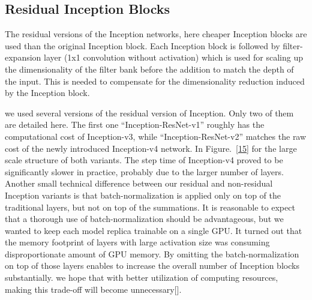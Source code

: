 \documentclass[a4paper,12pt, twoside]{NITKReport}
\begin{document}
\subsection{Residual Inception Blocks}
\par The residual versions of the Inception networks, here cheaper Inception  blocks are used than the original Inception block. Each Inception block is followed by filter-expansion layer (1x1 convolution  without  activation) which is used  for scaling up the dimensionality of the filter bank before the addition to match the depth of the input. This is needed to compensate for the dimensionality reduction induced by the Inception block.
\par we used several versions of the residual version of Inception. Only  two  of them are detailed here. The first one “Inception-ResNet-v1” roughly has the computational cost of Inception-v3, while “Inception-ResNet-v2” matches the raw cost of the newly introduced Inception-v4 network. In Figure.~\ref{15} for the large scale structure of both variants. The step time of Inception-v4 proved to be significantly slower in practice, probably due to the larger number of layers.
Another  small  technical  difference  between  our  residual and non-residual Inception variants is that batch-normalization is applied only on top of the traditional layers, but not on top of the summations. It is reasonable to expect that a thorough use of batch-normalization  should be advantageous, but we wanted to keep each model replica trainable on a single GPU. It turned out that the memory footprint of layers with large activation size was consuming disproportionate amount of GPU memory. By omitting the batch-normalization on top of those layers enables to increase the overall number of Inception blocks substantially. we hope that with better utilization of computing resources, making this trade-off will become unnecessary[\cite{DBLP:journals/corr/SzegedyIV16}].
\end{document}
